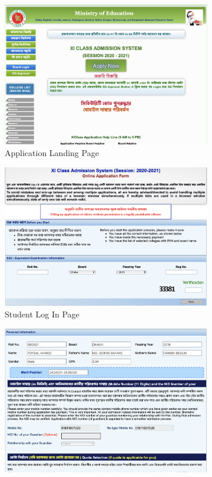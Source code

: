 \documentclass[sigconf,authordraft]{acmart}
\begin{document}
\begin{figure}[t]
	\centering
	\begin{subfigure}{.48\linewidth}
		\includegraphics[width = \linewidth]{landing_page}
		\caption{Application Landing Page}
		\label{fig:landing}
	\end{subfigure}
	\begin{subfigure}{.48\linewidth}
		\includegraphics[width = \linewidth]{log_in_page}
		\caption{Student Log In Page}
		\label{fig:login}
	\end{subfigure}
	\begin{subfigure}{.48\linewidth}
		\includegraphics[width = \linewidth]{contact_check}

\end{subfigure}
\end{figure}
\end{document}
